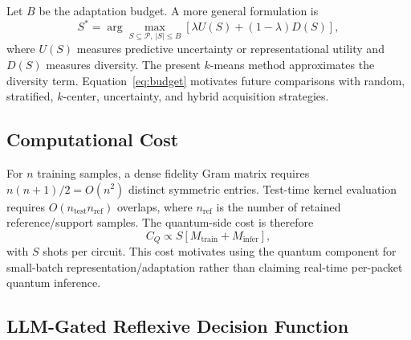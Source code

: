 \documentclass[conference]{IEEEtran}
\begin{document}
Let $B$ be the adaptation budget. A more general formulation is
\begin{equation}
S^* = \arg\max_{S \subseteq \mathcal{P},\, |S|\leq B}
\left[\lambda U(S) + (1-\lambda) D(S)\right],
\label{eq:budget}
\end{equation}
where $U(S)$ measures predictive uncertainty or representational utility
and $D(S)$ measures diversity. The present $k$-means method approximates
the diversity term. Equation~\eqref{eq:budget} motivates future
comparisons with random, stratified, $k$-center, uncertainty, and hybrid
acquisition strategies.

\subsection{Computational Cost}

For $n$ training samples, a dense fidelity Gram matrix requires
$n(n+1)/2 = O(n^2)$ distinct symmetric entries. Test-time kernel
evaluation requires $O(n_{\text{test}}n_{\text{ref}})$ overlaps, where
$n_{\text{ref}}$ is the number of retained reference/support samples. The
quantum-side cost is therefore
\begin{equation}
C_Q \propto S\left[M_{\text{train}} + M_{\text{infer}}\right],
\label{eq:cost}
\end{equation}
with $S$ shots per circuit. This cost motivates using the quantum
component for small-batch representation/adaptation rather than claiming
real-time per-packet quantum inference.

\subsection{LLM-Gated Reflexive Decision Function}
\label{subsec:llm_pilot}
\end{document}
